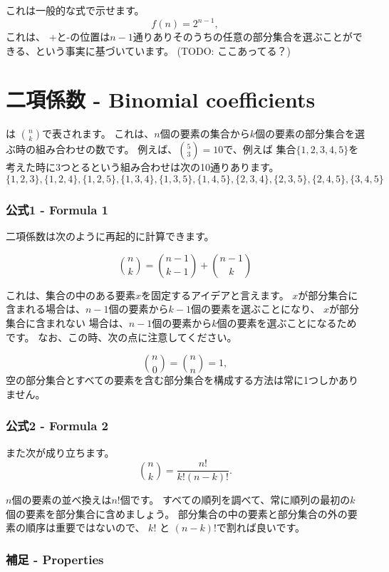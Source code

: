これは一般的な式で示せます。
\[
f(n)=2^{n-1},
\]
これは、 +と-の位置は$n-1$通りありそのうちの任意の部分集合を選ぶことができる、という事実に基づいています。
(TODO: ここあってる？)

\section{二項係数 - Binomial coefficients}


 は
${n \choose k}$で表されます。
これは、$n$個の要素の集合から$k$個の要素の部分集合を選ぶ時の組み合わせの数です。
例えば、${5 \choose 3}=10$で、例えば
集合$\{1,2,3,4,5\}$を考えた時に3つとるという組み合わせは次の10通りあります。
\[ \{1,2,3\}, \{1,2,4\}, \{1,2,5\}, \{1,3,4\}, \{1,3,5\},
\{1,4,5\}, \{2,3,4\}, \{2,3,5\}, \{2,4,5\}, \{3,4,5\} \]

\subsubsection{公式1 - Formula 1}

二項係数は次のように再起的に計算できます。

\[
{n \choose k}  =  {n-1 \choose k-1} + {n-1 \choose k}
\]

これは、集合の中のある要素$x$を固定するアイデアと言えます。
$x$が部分集合に含まれる場合は、$n - 1$個の要素から$k - 1$個の要素を選ぶことになり、
$x$が部分集合に含まれない 場合は、$n - 1$個の要素から$k$個の要素を選ぶことになるためです。
なお、この時、次の点に注意してください。

\[
{n \choose 0}  =  {n \choose n} = 1,
\]
空の部分集合とすべての要素を含む部分集合を構成する方法は常に1つしかありません。

\subsubsection{公式2 - Formula 2}

また次が成り立ちます。
\[
{n \choose k}  =  \frac{n!}{k!(n-k)!}.
\]


$n$個の要素の並べ換えは$n!$個です。
すべての順列を調べて、常に順列の最初の$k$個の要素を部分集合に含めましょう。
部分集合の中の要素と部分集合の外の要素の順序は重要ではないので、
$k!$ と $(n - k)!$で割れば良いです。

\subsubsection{補足 - Properties}

